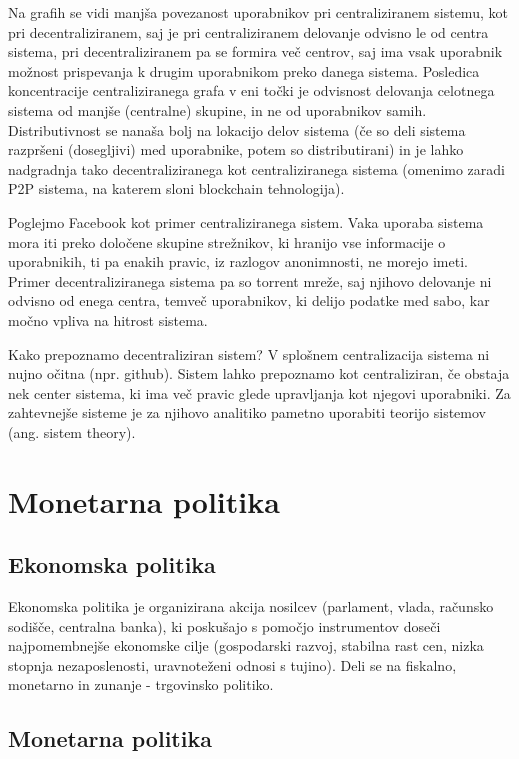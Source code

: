 \documentclass[letterpaper, titlepage, freqn]{article}
\begin{document}
Na grafih se vidi manjša povezanost uporabnikov pri centraliziranem sistemu, kot pri decentraliziranem, saj je pri centraliziranem delovanje odvisno le od centra sistema, pri decentraliziranem pa se formira več centrov, saj ima vsak uporabnik možnost prispevanja k drugim uporabnikom preko danega sistema.
Posledica koncentracije centraliziranega grafa v eni točki je odvisnost delovanja celotnega sistema od manjše (centralne) skupine, in ne od uporabnikov samih. 
Distributivnost se nanaša bolj na lokacijo delov sistema (če so deli sistema razpršeni (dosegljivi) med uporabnike, potem so distributirani) in je lahko nadgradnja tako decentraliziranega kot centraliziranega sistema (omenimo zaradi P2P sistema, na katerem sloni blockchain tehnologija).

Poglejmo Facebook kot primer centraliziranega sistem. Vaka uporaba sistema mora iti preko določene skupine strežnikov, ki hranijo vse informacije o uporabnikih, ti pa enakih pravic, iz razlogov anonimnosti, ne morejo imeti.
Primer decentraliziranega sistema pa so torrent mreže, saj njihovo delovanje ni odvisno od enega centra, temveč uporabnikov, ki delijo podatke med sabo, kar močno vpliva na hitrost sistema.

Kako prepoznamo decentraliziran sistem? V splošnem centralizacija sistema ni nujno očitna (npr. github). Sistem lahko prepoznamo kot centraliziran, če obstaja nek center sistema, ki ima več pravic glede upravljanja kot njegovi uporabniki.
Za zahtevnejše sisteme je za njihovo analitiko pametno uporabiti teorijo sistemov (ang. sistem theory).\\


\section{Monetarna politika}

\subsection{Ekonomska politika}

Ekonomska politika je organizirana akcija nosilcev (parlament, vlada, računsko sodišče, centralna banka), ki poskušajo s pomočjo instrumentov doseči najpomembnejše ekonomske cilje (gospodarski razvoj, stabilna rast cen, nizka stopnja nezaposlenosti, uravnoteženi odnosi s tujino). Deli se na fiskalno, monetarno in zunanje - trgovinsko politiko.\\

\subsection{Monetarna politika}
\end{document}
